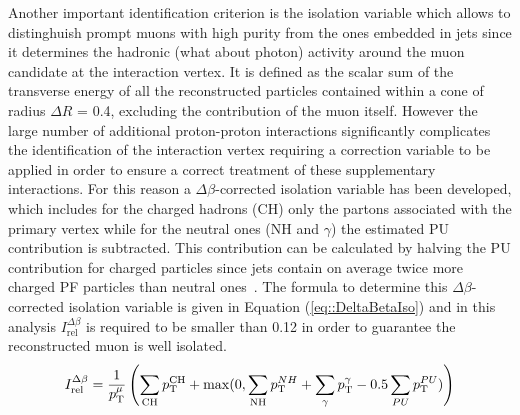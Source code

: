 Another important identification criterion is the isolation variable which allows to distinghuish prompt muons with high purity from the ones embedded in jets since it determines the hadronic (what about photon) activity around the muon candidate at the interaction vertex. %
It is defined as the scalar sum of the transverse energy of all the reconstructed particles contained within a cone of radius $\Delta R$ = 0.4, excluding the contribution of the muon itself.
However the large number of additional proton-proton interactions significantly complicates the identification of the interaction vertex requiring a correction variable to be applied in order to ensure a correct treatment of these supplementary interactions. 
For this reason a $\Delta \beta$-corrected isolation variable has been developed, which includes for the charged hadrons (CH) only the partons associated with the primary vertex while for the neutral ones (NH and $\gamma$) the estimated PU contribution is subtracted. This contribution can be calculated by halving the PU contribution for charged particles since jets contain on average twice more charged PF particles than neutral ones~\cite{CHContrVsN}. The formula to determine this $\Delta \beta$-corrected isolation variable is given in Equation (\ref{eq::DeltaBetaIso}) and in this analysis $I_{\textrm{rel}}^{\Delta \beta}$ is required to be smaller than 0.12 in order to guarantee the reconstructed muon is well isolated.
\begin{equation}\label{eq::DeltaBetaIso}
 I_{\textrm{rel}}^{\Delta \beta} = \frac{1}{p_{\rm T}^{\mu}} \left( \sum_{\textrm{CH}} p_{\rm T}^{\textrm{CH}} + \max(0, \sum_{\textrm{NH}} p_{\rm T}^{NH} + \sum_{\gamma} p_{\rm T}^{\gamma} - 0.5 \sum_{PU} p_{\rm T}^{PU}) \right)
\end{equation}
%

